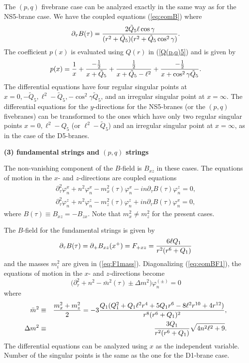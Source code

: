 \documentclass[a4paper,12pt]{article}
\begin{document}
The $(p,q)$ fivebrane case can be analyzed exactly in the
same way as for the NS5-brane case. We have the coupled
equations (\ref{eq:eomB}) where
\begin{equation}
\partial_\tau B(\tau)= {2\tilde{Q}_5\ell\cos\gamma \over 
(r^2+\tilde{Q}_5)(r^2+\tilde{Q}_5 \cos^2\gamma)}.
\label{eq:tBpq5}
\end{equation}
The coefficient $p(x)$ is evaluated using $Q(r)$ in
(\ref{Q(p,q)5}) and is given by
\begin{equation}
p(x)={1\over x}+{-{1\over 2}\over x+\tilde{Q}_{5} }
+{{1\over2}\over x+\tilde{Q}_{5}-\ell^2}
+{-{1\over 2}\over x+\cos^2\gamma \tilde{Q}_{5} }.
\end{equation}
The differential equations have four regular singular
points at $x=0, -\tilde{Q}_{5}, \ell^2-\tilde{Q}_{5}, 
-\cos^2\gamma \tilde{Q}_{5}$, 
and an irregular singular point at $x=\infty$. 
The differential equations for the $y$-directions 
for the NS5-branes (or the $(p,q)$ fivebranes) 
can be transformed to the ones which
have only two regular singular points $x=0, \ell^2-Q_{5}$
(or $\ell^2-\tilde{Q}_{5}$) and an irregular singular 
point at $x=\infty$, as in the case of the D5-branes.
\medskip

\noindent
{\bf (3) fundamental strings and $(p,q)$ strings}
\medskip

\noindent
The non-vanishing component of the $B$-field is
$B_{xz}$ in these cases. The equations of motion
in the $x$- and $z$-directions are coupled equations
\begin{eqnarray}
\partial^2_\tau \varphi_{n}^x +n^2 \varphi_{n}^x
-m_x^2(\tau) \varphi_{n}^x -i n \partial_\tau B(\tau)
\varphi_{n}^z=0,\nonumber\\
\partial^2_\tau \varphi_{n}^z +n^2 \varphi_{n}^z
-m_z^2(\tau) \varphi_{n}^z +i n \partial_\tau B(\tau)
\varphi_{n}^x=0,
\label{eq:eomBF1}
\end{eqnarray}
where $B(\tau)\equiv B_{xz}=-B_{zx}$. 
Note that $m^2_x\neq m^2_z$ for the present cases.

The $B$-field for the fundamental strings is given by
\begin{equation}
\partial_\tau B(\tau)= \partial_{+} B_{xz}(x^+)=F_{+xz}
= {6 \ell Q_1\over r^2 (r^6+Q_1)}
\end{equation}
and the masses  $m^{2}_{i}$ are given in 
(\ref{eq:F1mass}).
Diagonalizing (\ref{eq:eomBF1}), the equations of
motion in the $x$- and $z$-directions become
\begin{equation}
\Big( \partial^2_\tau +n^2 -\bar{m}^2(\tau)
\pm \Delta m^2 \Big) \varphi_{n}^{(\pm)}=0
\label{eq:F1diag}
\end{equation}
where 
\begin{eqnarray}
\bar{m}^2&\equiv&{m_x^2+m_z^2\over 2}
= -3 {Q_{1}(Q_{1}^2+Q_{1}\ell^2 r^4+5Q_{1}r^6-8\ell^2 r^{10}+
4r^{12})
\over r^8 (r^6+Q_{1})^2},  \\
\Delta m^2&\equiv& {3 Q_1\over r^2 (r^6+Q_1)}\sqrt{4n^2\ell^2+9}.
\end{eqnarray}
The differential equations can be analyzed using 
$x$ as the independent variable. Number of 
the singular points is the same as the one for the
D1-brane case.
\end{document}
